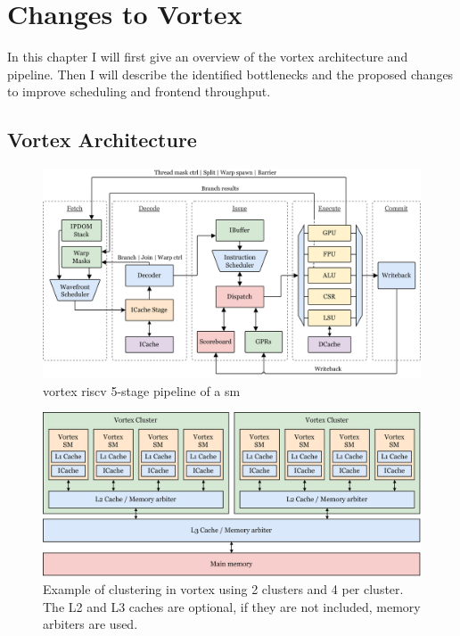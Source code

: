 \chapter{Changes to Vortex} \label{chap:changes}

In this chapter I will first give an overview of the \Gls{vortex} architecture and pipeline. Then I will describe the identified bottlenecks and the proposed changes to improve scheduling and frontend throughput. 

\section{Vortex Architecture}

\begin{figure}
    \centering
    \includegraphics[width=\textwidth]{figures/vortex-pipeline3.png}
    \caption{\Gls{vortex} \Gls{riscv} 5-stage pipeline of a \acrfull{sm}}
    \label{fig:vortex_microarchitecture}
\end{figure}

\begin{figure}
    \centering
    \includegraphics[width=\textwidth]{figures/vortex-cluster-color.png}
    \caption[Clustering of  in \Gls{vortex}.]{Example of  clustering in \Gls{vortex} using 2 clusters and 4  per cluster. The L2 and L3 caches are optional, if they are not included, memory arbiters are used.}
    \label{fig:clustering}
\end{figure}

